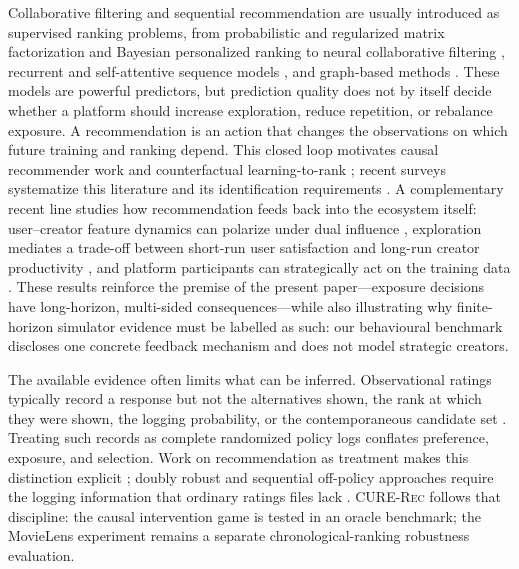\documentclass[review]{elsarticle}
\theoremstyle{plain}
\theoremstyle{definition}
\theoremstyle{remark}
\newcommand{\CURE}{\textsc{CURE-Rec}}
\begin{document}
Collaborative filtering and sequential recommendation are usually introduced as supervised ranking problems, from probabilistic and regularized matrix factorization \cite{mnih2008probabilistic,koren2009matrix} and Bayesian personalized ranking \cite{rendle2009bpr,pan2008oneclass} to neural collaborative filtering \cite{he2017ncf}, recurrent and self-attentive sequence models \cite{hidasi2016gru,kang2018sasrec,sun2019bert4rec}, and graph-based methods \cite{wang2019ngcf,he2020lightgcn}. These models are powerful predictors, but prediction quality does not by itself decide whether a platform should increase exploration, reduce repetition, or rebalance exposure. A recommendation is an action that changes the observations on which future training and ranking depend. This closed loop motivates causal recommender work and counterfactual learning-to-rank \cite{swaminathan2015counterfactual,joachims2017unbiased,wang2023causal,bonner2018causal}; recent surveys systematize this literature and its identification requirements \cite{gao2024causal}. A complementary recent line studies how recommendation feeds back into the ecosystem itself: user--creator feature dynamics can polarize under dual influence \cite{lin2024polarization}, exploration mediates a trade-off between short-run user satisfaction and long-run creator productivity \cite{yao2024satisfaction}, and platform participants can strategically act on the training data \cite{baumann2024collective}. These results reinforce the premise of the present paper---exposure decisions have long-horizon, multi-sided consequences---while also illustrating why finite-horizon simulator evidence must be labelled as such: our behavioural benchmark discloses one concrete feedback mechanism and does not model strategic creators.

The available evidence often limits what can be inferred. Observational ratings typically record a response but not the alternatives shown, the rank at which they were shown, the logging probability, or the contemporaneous candidate set \cite{pearl2009causality,athey2017state}. Treating such records as complete randomized policy logs conflates preference, exposure, and selection. Work on recommendation as treatment makes this distinction explicit \cite{schnabel2016recommendations}; doubly robust and sequential off-policy approaches require the logging information that ordinary ratings files lack \cite{dudik2014doubly,kallus2020efficient}. \CURE{} follows that discipline: the causal intervention game is tested in an oracle benchmark; the MovieLens experiment remains a separate chronological-ranking robustness evaluation.
\end{document}

